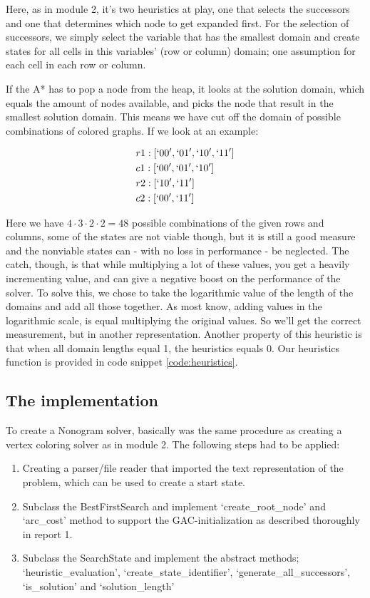 Here, as in module 2, it's two heuristics at play, one that selects the successors and one that determines which node to get expanded first. For the selection of successors, we simply select the variable that has the smallest domain and create states for all cells in this variables' (row or column) domain; one assumption for each cell in each row or column.

If the A* has to pop a node from the heap, it looks at the solution domain, which equals the amount of nodes available, and picks the node that result in the smallest solution domain. This means we have cut off the domain of possible combinations of colored graphs. If we look at an example:

\begin{align*}
	&r1: [`00',`01',`10',`11']\\
	&c1: [`00',`01',`10']\\
	&r2: [`10',`11']\\
	&c2: [`00',`11']
\end{align*}

Here we have \(4 \cdot 3 \cdot 2 \cdot 2 = 48\) possible combinations of the given rows and columns, some of the states are not viable though, but it is still a good measure and the nonviable states can - with no loss in performance - be neglected. The catch, though, is that while multiplying a lot of these values, you get a heavily incrementing value, and can give a negative boost on the performance of the solver. To solve this, we chose to take the logarithmic value of the length of the domains and add all those together. As most know, adding values in the logarithmic scale, is equal multiplying the original values. So we'll get the correct measurement, but in another representation. Another property of this heuristic is that when all domain lengths equal 1, the heuristics equals 0. Our heuristics function is provided in code snippet \ref{code:heuristics}.



\subsection{The implementation}
To create a Nonogram solver, basically was the same procedure as creating a vertex coloring solver as in module 2. The following steps had to be applied:
\begin{enumerate}
	\item{Creating a parser/file reader that imported the text representation of the problem, which can be used to create a start state.}
	\item{Subclass the BestFirstSearch and implement `create\_root\_node' and `arc\_cost' method to support the GAC-initialization as described thoroughly in report 1.}
	\item{Subclass the SearchState and implement the abstract methods; `heuristic\_evaluation', `create\_state\_identifier', `generate\_all\_successors', `is\_solution' and `solution\_length' }
\end{enumerate}

